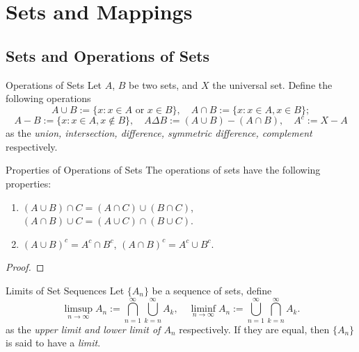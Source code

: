 
\section{Sets and Mappings}

\subsection{Sets and Operations of Sets}

\begin{definition}{Operations of Sets}{}
  Let $A$, $B$ be two sets,
  and $X$ the universal set.
  Define the following operations
  \begin{equation}
    A \cup B := \{x: x \in A \text{ or } x \in B\}, \quad
    A \cap B := \{x: x \in A, x \in B\};
  \end{equation}
  \begin{equation}
    A - B := \{x: x \in A, x \not\in B\}, \quad
    A \Delta B := (A \cup B) - (A \cap B), \quad
    A^c := X - A
  \end{equation}
  as the \emph{union, intersection, difference, symmetric difference, complement} respectively.
\end{definition}

\begin{proposition}{Properties of Operations of Sets}{}
  The operations of sets have the following properties:
  \begin{enumerate}
  \item $(A \cup B)\cap C = (A \cap C) \cup (B \cap C)$,
    $(A \cap B) \cup C = (A \cup C) \cap (B \cup C)$.
  \item $(A\cup B)^c = A^c \cap B^c$, $(A \cap B)^c = A^c \cup B^c$.
  \end{enumerate}
\end{proposition}

\begin{proof}
  
\end{proof}

\begin{definition}{Limits of Set Sequences}{}
  Let $\{A_n\}$ be a sequence of sets,
  define
  \begin{equation}
    \limsup \limits_{n \rightarrow \infty} A_n := \bigcap \limits_{n = 1}^{\infty}
    \bigcup \limits_{k = n} ^{\infty} A_k, \quad
    \liminf \limits_{n \rightarrow \infty} A_n := \bigcup \limits_{n = 1}^{\infty}
    \bigcap \limits_{k = n}^{\infty}A_k.
  \end{equation}
  as the \emph{upper limit and lower limit of $A_n$} respectively.
  If they are equal, then $\{A_n\}$ is said to have a \emph{limit}.
\end{definition}

